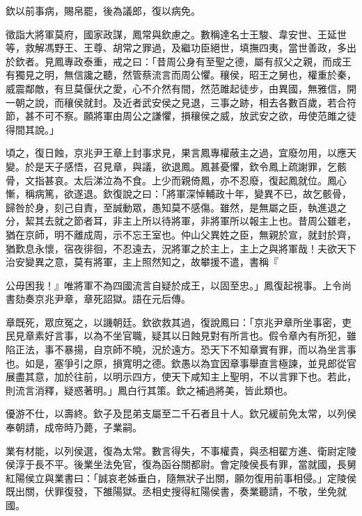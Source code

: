 \begin{pinyinscope}
欽以前事病，賜帛罷，後為議郎，復以病免。

徵詣大將軍莫府，國家政謀，鳳常與欽慮之。數稱達名士王駿、韋安世、王延世等，救解馮野王、王尊、胡常之罪過，及繼功臣絕世，填撫四夷，當世善政，多出於欽者。見鳳專政泰重，戒之曰：「昔周公身有至聖之德，屬有叔父之親，而成王有獨見之明，無信讒之聽，然管蔡流言而周公懼。穰侯，昭王之舅也，權重於秦，威震鄰敵，有旦莫偃伏之愛，心不介然有間，然范雎起徒步，由異國，無雅信，開一朝之說，而穰侯就封。及近者武安侯之見退，三事之跡，相去各數百歲，若合符節，甚不可不察。願將軍由周公之謙懼，損穰侯之威，放武安之欲，毋使范雎之徒得間其說。」

頃之，復日蝕，京兆尹王章上封事求見，果言鳳專權蔽主之過，宜廢勿用，以應天變。於是天子感悟，召見章，與議，欲退鳳。鳳甚憂懼，欽令鳳上疏謝罪，乞骸骨，文指甚哀。太后涕泣為不食。上少而親倚鳳，亦不忍廢，復起鳳就位。鳳心慚，稱病篤，欲遂退。欽復說之曰：「將軍深悼輔政十年，變異不已，故乞骸骨，歸咎於身，刻己自責，至誠動眾，愚知莫不感傷。雖然，是無屬之臣，執進退之分，絜其去就之節者耳，非主上所以待將軍，非將軍所以報主上也。昔周公雖老，猶在京師，明不離成周，示不忘王室也。仲山父異姓之臣，無親於宣，就封於齊，猶歎息永懷，宿夜徘徊，不忍遠去，況將軍之於主上，主上之與將軍哉！夫欲天下治安變異之意，莫有將軍，主上照然知之，故攀援不遣，書稱『

公毋困我！』唯將軍不為四國流言自疑於成王，以固至忠。」鳳復起視事。上令尚書劾奏京兆尹章，章死詔獄。語在元后傳。

章既死，眾庶冤之，以譏朝廷。欽欲救其過，復說鳳曰：「京兆尹章所坐事密，吏民見章素好言事，以為不坐官職，疑其以日蝕見對有所言也。假令章內有所犯，雖陷正法，事不暴揚，自京師不曉，況於遠方。恐天下不知章實有罪，而以為坐言事也。如是，塞爭引之原，損寬明之德。欽愚以為宜因章事舉直言極諫，並見郎從官展盡其意，加於往前，以明示四方，使天下咸知主上聖明，不以言罪下也。若此，則流言消釋，疑惑著明。」鳳白行其策。欽之補過將美，皆此類也。

優游不仕，以壽終。欽子及昆弟支屬至二千石者且十人。欽兄緩前免太常，以列侯奉朝請，成帝時乃薨，子業嗣。

業有材能，以列侯選，復為太常。數言得失，不事權貴，與丞相翟方進、衛尉定陵侯淳于長不平。後業坐法免官，復為函谷關都尉。會定陵侯長有罪，當就國，長舅紅陽侯立與業書曰：「誠哀老姊垂白，隨無狀子出關，願勿復用前事相侵。」定陵侯既出關，伏罪復發，下雒陽獄。丞相史搜得紅陽侯書，奏業聽請，不敬，坐免就國。


\end{pinyinscope}
